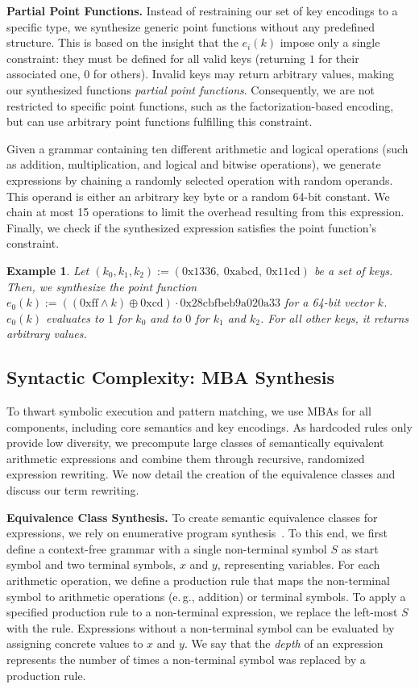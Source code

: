 \documentclass[letterpaper,twocolumn,10pt]{article}
\newcommand{\eg}{e.\,g.,\xspace}
\theoremstyle{customexample}
\newtheorem{example}{Example}
\theoremstyle{customexperiment}
\begin{document}
\textbf{Partial Point Functions.}
Instead of restraining our set of key encodings to a specific type, we synthesize generic point functions without any predefined structure. 
This is based on the insight that the $e_i(k)$ impose only a single constraint: they must be defined for all valid keys (returning $1$ for their associated one, $0$ for others). Invalid keys may return arbitrary values, making our synthesized functions \emph{partial point functions}. 
Consequently, we are not restricted to specific point functions, such as the factorization-based encoding, but can use arbitrary point functions fulfilling this constraint. 

Given a grammar containing ten different arithmetic and logical operations (such as addition, multiplication, and logical and bitwise operations), we generate expressions by chaining a randomly selected operation with random operands. This operand is either an arbitrary key byte or a random 64-bit constant. We chain at most 15 operations to limit the overhead resulting from this expression. Finally, we check if the synthesized expression satisfies the point function's constraint.
\begin{example}
Let  $(k_0, k_1, k_2) := (\mathrm{0x1336},~\mathrm{0xabcd},~\mathrm{0x11cd})$ be a set of keys. Then, we synthesize the point function $e_0(k) :=((\mathrm{0xff} \land k) \oplus \mathrm{0xcd}) \cdot \mathrm{0x28cbfbeb9a020a33}$ for a 64-bit vector $k$. $e_0(k)$ evaluates to $1$ for $k_0$ and to $0$ for $k_1$ and $k_2$. 
For all other keys, it returns arbitrary values.
\end{example}

\subsection{Syntactic Complexity: MBA Synthesis}\label{sec:design:mba_synthesis}


To thwart symbolic execution and pattern matching, we use MBAs for all components, including core semantics and key encodings.
As hardcoded rules only provide low diversity, we precompute large classes of semantically equivalent arithmetic expressions and combine them through recursive, randomized expression rewriting. We now detail the creation of the equivalence classes and discuss our term rewriting.


\textbf{Equivalence Class Synthesis.}
To create semantic equivalence classes for expressions, we rely on enumerative program synthesis~\cite{gulwani2010dimensions,bansal2006automatic}. To this end, we first define a context-free grammar with a single non-terminal symbol $S$ as start symbol and two terminal symbols, $x$ and $y$, representing variables. For each arithmetic operation, we define a production rule that maps the non-terminal symbol to arithmetic operations (\eg addition) or terminal symbols. To apply a specified production rule to a non-terminal expression, we replace the left-most $S$ with the rule. Expressions without a non-terminal symbol can be evaluated by assigning concrete values to $x$ and $y$. We say that the \emph{depth} of an expression represents the number of times a non-terminal symbol was replaced by a production rule.
\end{document}
